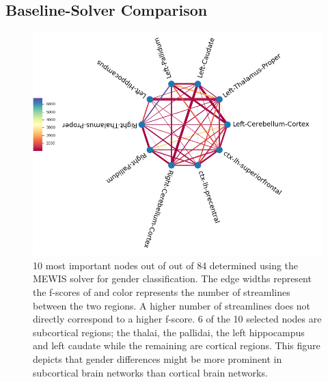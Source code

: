 \documentclass[msthesis.tex]{subfiles}
\begin{document}
\subsection{Baseline-Solver Comparison}
\begin{figure}
    \centering
    \includegraphics[width=\textwidth]{images/solver_10nodes_strls.png}
    \caption{10 most important nodes out of out of 84 determined using the \gls{MEWIS} solver for gender classification. The edge widths represent the f-scores of and color represents the number of streamlines between the two regions. A higher number of streamlines does not directly correspond to a higher f-score. 6 of the 10 selected nodes are subcortical regions; the thalai, the pallidai, the left hippocampus and left caudate while the remaining are cortical regions. This figure depicts that gender differences might be more prominent in subcortical brain networks than cortical brain networks. }
    \label{fig:gender_num_strls_10}
\end{figure}
\end{document}
